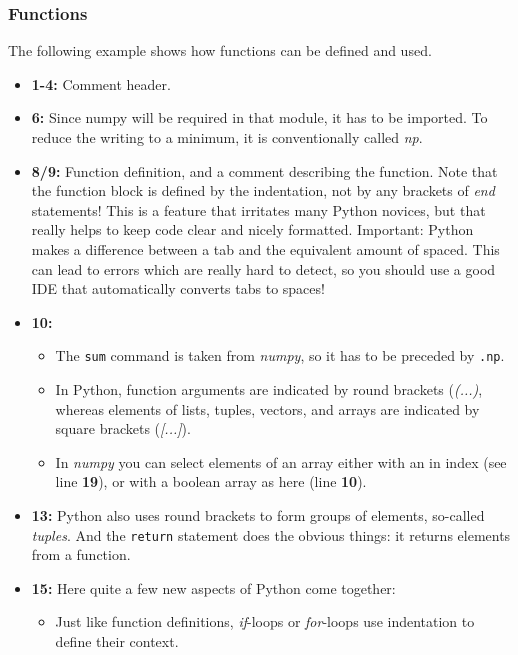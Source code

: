 \subsubsection{Functions}
The following example shows how functions can be defined and used.



\begin{itemize}
  \item \textbf{1-4:} Comment header.
  \item \textbf{6:} Since numpy will be required in that module, it has to be imported. To reduce the writing to a minimum, it is conventionally called \emph{np}.
  \item \textbf{8/9:} Function definition, and a comment describing the function. Note that the function block is defined by the indentation, not by any brackets of \emph{end} statements! This is a feature that irritates many Python novices, but that really helps to keep code clear and nicely formatted. Important: Python makes a difference between a tab and the equivalent amount of spaced. This can lead to errors which are really hard to detect, so you should use a good IDE that automatically converts tabs to spaces!
  \item \textbf{10:}
    \begin{itemize}
      \item The \lstinline{sum} command is taken from \emph{numpy}, so it has to be preceded by \lstinline{.np}.
      \item In Python, function arguments are indicated by round brackets (\emph{(...)}, whereas elements of lists, tuples, vectors, and arrays are indicated by square brackets (\emph{[...]}).
      \item In \emph{numpy} you can select elements of an array either with an in index (see line \textbf{19}), or with a boolean array as here (line \textbf{10}).
    \end{itemize}
  \item \textbf{13:} Python also uses round brackets to form groups of elements, so-called \emph{tuples}. And the \lstinline{return} statement does the obvious things: it returns elements from a function.
  \item \textbf{15:} Here quite a few new aspects of Python come together:
      \begin{itemize}
        \item Just like function definitions, \emph{if}-loops or \emph{for}-loops use indentation to define their context.

\end{itemize}
\end{itemize}
